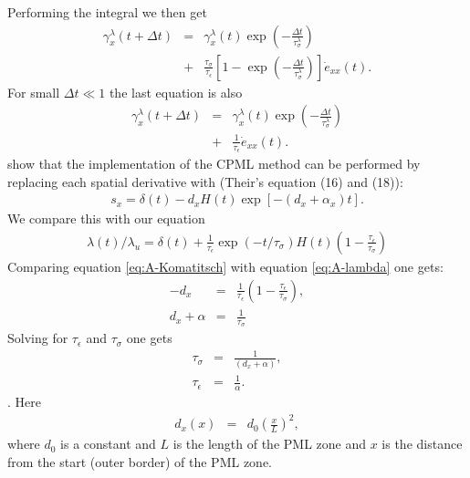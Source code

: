 \documentclass[11pt]{article}
\begin{document}
Performing the integral we then get
\begin{eqnarray*}
\gamma^{\lambda}_x(t+\Delta t) 
   & = & \gamma^{\lambda}_x (t)\exp(-\frac{\Delta t}{\tau^{\lambda}_{\sigma}}) \\
   & + & \frac{\tau_{\sigma}}{\tau_{\epsilon}}
         \left[1-\exp(-\frac{\Delta t}{\tau^{\lambda}_{\sigma}})\right]
         \dot{e}_{xx}(t).
\end{eqnarray*}
%
For small $\Delta t \ll 1$ the last equation is also
\begin{eqnarray*}
\gamma^{\lambda}_x(t+\Delta t) 
   & = & \gamma^{\lambda}_x (t)\exp(-\frac{\Delta t}{\tau^{\lambda}_{\sigma}}) \\
   & + & \frac{1}{\tau_{\epsilon}}\dot{e}_{xx}(t).
\end{eqnarray*}
\cite{Komatitsch2007} show that the implementation of the CPML method can
be performed by replacing each spatial derivative with
(Their's equation (16) and (18)):
\begin{eqnarray}
  s_x = \delta(t) - d_x H(t) \exp \left[-(d_x+\alpha_x)t\right].
                                          \label{eq:A-Komatitsch} 
\end{eqnarray}
We compare this with our equation
\begin{eqnarray}
  \lambda(t)/\lambda_u = \delta(t) + \frac{1}{\tau_{\epsilon}}
                         \exp(-t/\tau_{\sigma}) H(t)
                         \left(1-\frac{\tau_{\epsilon}}{\tau_{\sigma}}\right)
                                           \label{eq:A-lambda}
\end{eqnarray}
Comparing equation \eqref{eq:A-Komatitsch} with equation
\eqref{eq:A-lambda} one gets:
\begin{eqnarray}
-d_x         & = & \frac{1}{\tau_{\epsilon}}\left(1-\frac{\tau_{\epsilon}}
                                            {\tau_{\sigma}}\right), \\
d_x +\alpha & = & \frac{1}{\tau_{\sigma}}
\end{eqnarray}
Solving for $\tau_{\epsilon}$ and $\tau_{\sigma}$ one gets
\begin{eqnarray}
  \tau_{\sigma}   & = & \frac{1}{(d_x+\alpha)},\\
  \tau_{\epsilon} & = & \frac{1}{\alpha}.
\end{eqnarray}.
Here 
\begin{eqnarray}
 d_x (x) & = & d_0 \left(\frac{x}{L}\right)^2,
\end{eqnarray}
where $d_0$ is a constant and $L$ is the length of
the PML zone and $x$ is the distance from the start (outer border)
of the PML zone.
\end{document}
